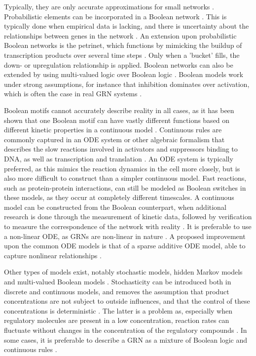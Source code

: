 \documentclass[../main.tex]{subfiles}
\begin{document}
Typically, they are only accurate approximations for small networks \cite{karlebach2008modelling}.
Probabilistic elements can be incorporated in a Boolean network \cite{schlitt2007current}.
This is typically done when empirical data is lacking, and there is uncertainty about the relationships between genes in the network \cite{karlebach2008modelling}.
An extension upon probabilistic Boolean networks is the petrinet, which functions by mimicking the buildup of transcription products over several time steps \cite{karlebach2008modelling}.
Only when a 'bucket' fills, the down- or upregulation relationship is applied.
Boolean networks can also be extended by using multi-valued logic over Boolean logic \cite{geard2009dynamical}.
Boolean models work under strong assumptions, for instance that inhibition dominates over activation, which is often the case in real GRN systems \cite{he2016algorithm, wang2010process}. %

Boolean motifs cannot accurately describe reality in all cases, as it has been shown that one Boolean motif can have vastly different functions based on different kinetic properties in a continuous model \cite{ingram2006network}.
Continuous rules are commonly captured in an ODE system or other algebraic formalism that describes the slow reactions involved in activators and suppressors binding to DNA, as well as transcription and translation \cite{ingram2006network}.
An ODE system is typically preferred, as this mimics the reaction dynamics in the cell more closely, but is also more difficult to construct than a simpler continuous model.
Fast reactions, such as protein-protein interactions, can still be modeled as Boolean switches in these models, as they occur at completely different timescales.
A continuous model can be constructed  from the Boolean counterpart, when additional research is done through the measurement of kinetic data, followed by verification to measure the correspondence of the network with reality \cite{bolouri2002modeling}.
It is preferable to use a non-linear ODE, as GRNs are non-linear in nature \cite{qian2008inference, tyson2003sniffers}.
A proposed improvement upon the common ODE models is that of a sparse additive ODE model, able to capture nonlinear relationships \cite{wu2014sparse}.

Other types of models exist, notably stochastic models, hidden Markov models and multi-valued Boolean models \cite{bolouri2002modeling, geard2009dynamical, wu2014sparse}. %
Stochasticity can be introduced both in discrete and continuous models, and removes the assumption that product concentrations are not subject to outside influences, and that the control of these concentrations is deterministic \cite{geard2009dynamical}.
The latter is a problem as, especially when regulatory molecules are present in a low concentration, reaction rates can fluctuate without changes in the concentration of the regulatory compounds \cite{geard2009dynamical}.
In some cases, it is preferable to describe a GRN as a mixture of Boolean logic and continuous rules \cite{bolouri2002modeling}.
\end{document}
